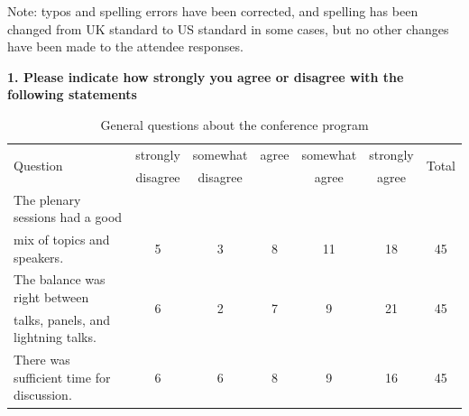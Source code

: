 Note: typos and spelling errors have been corrected, and spelling has been changed from UK standard to US standard in some cases, but no other changes have been made to the attendee responses.

\hspace{0.2cm}

\noindent \textbf{1. Please indicate how strongly you agree or disagree with the following statements}

\begin{table}[h!]
\centering
\caption{General questions about the conference program}
\label{tab:survey_program}
{\scriptsize
\begin{tabular}{@{}lcccccc@{}}
\toprule
\multirow{2}{*}{Question} & strongly & somewhat & agree & somewhat & strongly &
\multirow{2}{*}{Total} \\
& disagree & disagree & & agree & agree & \\
\midrule
\rowcolor{lightgray} The plenary sessions had a good & & & & & & \\
\rowcolor{lightgray} mix of topics and speakers. &
\multirow{-2}{*}{5} &
\multirow{-2}{*}{3} &
\multirow{-2}{*}{8} &
\multirow{-2}{*}{11} &
\multirow{-2}{*}{18} &
\multirow{-2}{*}{45} \\
The balance was right between &
\multirow{2}{*}{6} &
\multirow{2}{*}{2} &
\multirow{2}{*}{7} &
\multirow{2}{*}{9} &
\multirow{2}{*}{21} &
\multirow{2}{*}{45} \\
talks, panels, and lightning talks. & & & & & & \\
\rowcolor{lightgray} There was sufficient time for discussion. &
6 &
6 &
8 &
9 &
16 &
45 \\
\bottomrule
\end{tabular}
}
\end{table}



